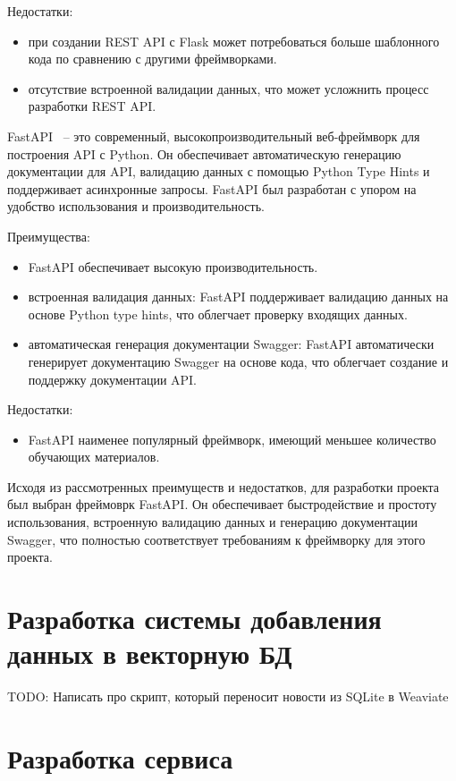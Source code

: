 Недостатки:
\begin{itemize}
    \item при создании REST API с Flask может потребоваться больше шаблонного кода по сравнению с другими фреймворками.
    \item отсутствие встроенной валидации данных, что может усложнить процесс разработки REST API.
\end{itemize}

FastAPI ~-- это современный, высокопроизводительный веб-фреймворк для построения API с Python. Он обеспечивает автоматическую генерацию документации для API, валидацию данных с помощью Python Type Hints и поддерживает асинхронные запросы. FastAPI был разработан с упором на удобство использования и производительность.

Преимущества:
\begin{itemize}
    \item FastAPI обеспечивает высокую производительность.
    \item встроенная валидация данных: FastAPI поддерживает валидацию данных на основе Python type hints, что облегчает проверку входящих данных.
    \item автоматическая генерация документации Swagger: FastAPI автоматически генерирует документацию Swagger на основе кода, что облегчает создание и поддержку документации API.
\end{itemize}

Недостатки:
\begin{itemize}
    \item FastAPI наименее популярный фреймворк, имеющий меньшее количество обучающих материалов.
\end{itemize}

Исходя из рассмотренных преимуществ и недостатков, для разработки проекта был выбран фреймоврк FastAPI. Он обеспечивает быстродействие и простоту использования, встроенную валидацию данных и генерацию документации Swagger, что полностью соответствует требованиям к фреймворку для этого проекта.

\section{Разработка системы добавления данных в векторную БД}

TODO: Написать про скрипт, который переносит новости из SQLite в Weaviate

\section{Разработка сервиса}

